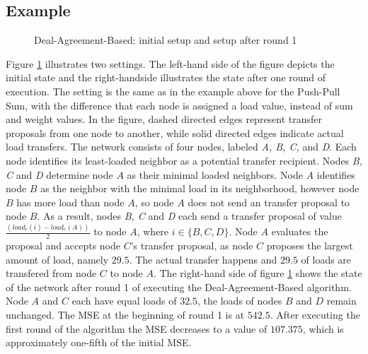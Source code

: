 \subsection{Example}\label{subsec:exampleDAB}
 \begin{figure}
    \centering
    \scalebox{0.75}{}
    \caption{Deal-Agreement-Based: initial setup and setup after round 1}
    \label{fig:DABExampleAlgo}
 \end{figure}
Figure \ref{fig:DABExampleAlgo} illustrates two settings. The left-hand side of the figure depicts the initial state and the right-handside illustrates the state after one round of execution. The setting is the same as in the example above for the Push-Pull Sum, with the difference that each node is assigned a load value, instead of sum and weight values. In the figure, dashed directed edges represent transfer proposals from one node to another, while solid directed edges indicate actual load transfers. The network consists of four nodes, labeled \textit{A, B, C,} and \textit{D}. Each node identifies its least-loaded neighbor as a potential transfer recipient. Nodes \textit{B, C} and \textit{D} determine node $A$ as their minimal loaded neighbors. Node $A$ identifies node $B$ as the neighbor with the minimal load in its neighborhood, however node $B$ has more load than node $A$, so node $A$ does not send an transfer proposal to node $B$. As a result, nodes \textit{B, C} and \textit{D} each send a transfer proposal of value $\frac{(load_r(i)-load_r(A))}{2}$ to node $A$, where $i \in \{B,C,D\}$. Node $A$ evaluates the proposal and accepts node $C$'s transfer proposal, as node $C$ proposes the largest amount of load, namely $29.5$. The actual transfer happens and $29.5$ of loads are transfered from node $C$ to node $A$. The right-hand side of figure \ref{fig:DABExampleAlgo} shows the state of the network after round 1 of executing the Deal-Agreement-Based algorithm. Node $A$ and $C$ each have equal loads of $32.5$, the loads of nodes $B$ and $D$ remain unchanged. The MSE at the beginning of round 1 is at $542.5$. After executing the first round of the algorithm the MSE decreases to a value of $107.375$, which is approximately one-fifth of the initial MSE.

